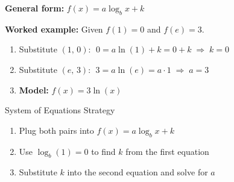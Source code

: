 \documentclass[aspectratio=169, 11pt]{beamer}
\begin{document}
\begin{frame}[t, plain]

  \vspace{0.3cm}
  \textbf{General form:} $f(x) = a\log_b x + k$

  \vspace{0.3cm}
  \textbf{Worked example:} Given $f(1) = 0$ and $f(e) = 3$.

  \begin{enumerate}
    \setlength{\itemsep}{6pt}
    \item Substitute $(1,\,0)$: $\;0 = a\ln(1) + k = 0 + k \;\Rightarrow\; k = 0$
    \item Substitute $(e,\,3)$: $\;3 = a\ln(e) = a \cdot 1 \;\Rightarrow\; a = 3$
    \item \textbf{Model:} $f(x) = 3\ln(x)$
  \end{enumerate}

  \vspace{0.3cm}
  \begin{block}{System of Equations Strategy}
    \begin{enumerate}
      \setlength{\itemsep}{4pt}
      \item Plug both pairs into $f(x) = a\log_b x + k$
      \item Use $\log_b(1) = 0$ to find $k$ from the first equation
      \item Substitute $k$ into the second equation and solve for $a$
    \end{enumerate}
  \end{block}
\end{frame}
\end{document}
